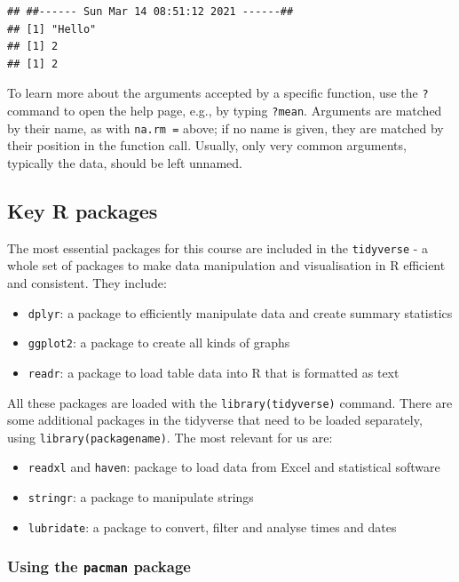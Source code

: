 \documentclass[
]{book}
\providecommand{\tightlist}{%
  \setlength{\itemsep}{0pt}\setlength{\parskip}{0pt}}
\begin{document}
\begin{verbatim}
## ##------ Sun Mar 14 08:51:12 2021 ------##
## [1] "Hello"
## [1] 2
## [1] 2
\end{verbatim}

To learn more about the arguments accepted by a specific function, use the \texttt{?} command to open the help page, e.g., by typing \texttt{?mean}. Arguments are matched by their name, as with \texttt{na.rm\ =} above; if no name is given, they are matched by their position in the function call. Usually, only very common arguments, typically the data, should be left unnamed.

\hypertarget{key-r-packages}{%
\subsection{Key R packages}\label{key-r-packages}}

The most essential packages for this course are included in the \texttt{tidyverse} - a whole set of packages to make data manipulation and visualisation in R efficient and consistent. They include:

\begin{itemize}
\tightlist
\item
  \texttt{dplyr}: a package to efficiently manipulate data and create summary statistics
\item
  \texttt{ggplot2}: a package to create all kinds of graphs
\item
  \texttt{readr}: a package to load table data into R that is formatted as text
\end{itemize}

All these packages are loaded with the \texttt{library(tidyverse)} command. There are some additional packages in the tidyverse that need to be loaded separately, using \texttt{library(packagename)}. The most relevant for us are:

\begin{itemize}
\tightlist
\item
  \texttt{readxl} and \texttt{haven}: package to load data from Excel and statistical software
\item
  \texttt{stringr}: a package to manipulate strings
\item
  \texttt{lubridate}: a package to convert, filter and analyse times and dates
\end{itemize}

\hypertarget{using-the-pacman-package}{%
\subsubsection{\texorpdfstring{Using the \texttt{pacman} package}{Using the pacman package}}\label{using-the-pacman-package}}
\end{document}
